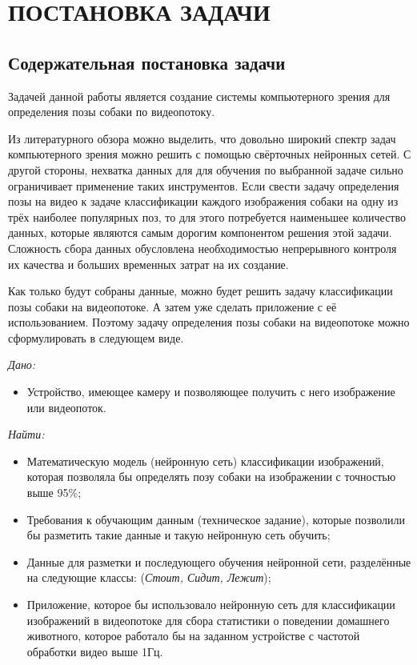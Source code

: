 \chapter{ПОСТАНОВКА ЗАДАЧИ} \label{chapt2}

\section{Содержательная постановка задачи} \label{sect2_1}
Задачей данной работы является создание системы компьютерного зрения для определения позы собаки по видеопотоку.

Из литературного обзора можно выделить, что довольно широкий спектр задач компьютерного зрения можно решить с помощью свёрточных нейронных сетей. С другой стороны, нехватка данных для для обучения по выбранной задаче сильно ограничивает применение таких инструментов. Если свести задачу определения позы на видео к задаче классификации каждого изображения собаки на одну из трёх наиболее популярных поз, то для этого потребуется наименьшее количество данных, которые являются самым дорогим компонентом решения этой задачи. Сложность сбора данных обусловлена необходимостью непрерывного контроля их качества и больших временных затрат на их создание.

Как только будут собраны данные, можно будет решить задачу классификации позы собаки на видеопотоке. А затем уже сделать приложение с её использованием. Поэтому задачу определения позы собаки на видеопотоке можно сформулировать в следующем виде.

\textit{Дано: } 

\begin{itemize}[wide]
    \item Устройство, имеющее камеру и позволяющее получить с него изображение или видеопоток.
\end{itemize}

\textit{Найти: }
\begin{itemize}[wide]
    \item Математическую модель (нейронную сеть) классификации изображений, которая позволяла бы определять позу собаки на изображении с точностью выше 95\%;
    \item Требования к обучающим данным (техническое задание), которые позволили бы разметить такие данные и такую нейронную сеть обучить;
    \item Данные для разметки и последующего обучения нейронной сети, разделённые на следующие классы: (\emph{Стоит,  Сидит,  Лежит});
    \item Приложение, которое бы использовало нейронную сеть для классификации изображений в видеопотоке для сбора статистики о поведении домашнего животного, которое работало бы на заданном устройстве с частотой обработки видео выше 1Гц.
\end{itemize}


